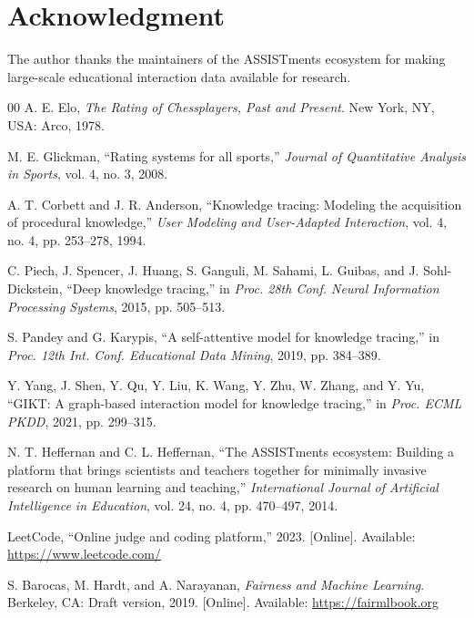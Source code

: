 \documentclass[conference]{IEEEtran}
\begin{document}
\section*{Acknowledgment}
The author thanks the maintainers of the ASSISTments ecosystem for making large-scale educational interaction data available for research.

\begin{thebibliography}{00}
A. E. Elo, \textit{The Rating of Chessplayers, Past and Present}. New York, NY, USA: Arco, 1978.

M. E. Glickman, ``Rating systems for all sports,'' \textit{Journal of Quantitative Analysis in Sports}, vol. 4, no. 3, 2008.

A. T. Corbett and J. R. Anderson, ``Knowledge tracing: Modeling the acquisition of procedural knowledge,'' \textit{User Modeling and User-Adapted Interaction}, vol. 4, no. 4, pp. 253--278, 1994.

C. Piech, J. Spencer, J. Huang, S. Ganguli, M. Sahami, L. Guibas, and J. Sohl-Dickstein, ``Deep knowledge tracing,'' in \textit{Proc. 28th Conf. Neural Information Processing Systems}, 2015, pp. 505--513.

S. Pandey and G. Karypis, ``A self-attentive model for knowledge tracing,'' in \textit{Proc. 12th Int. Conf. Educational Data Mining}, 2019, pp. 384--389.

Y. Yang, J. Shen, Y. Qu, Y. Liu, K. Wang, Y. Zhu, W. Zhang, and Y. Yu, ``GIKT: A graph-based interaction model for knowledge tracing,'' in \textit{Proc. ECML PKDD}, 2021, pp. 299--315.

N. T. Heffernan and C. L. Heffernan, ``The ASSISTments ecosystem: Building a platform that brings scientists and teachers together for minimally invasive research on human learning and teaching,'' \textit{International Journal of Artificial Intelligence in Education}, vol. 24, no. 4, pp. 470--497, 2014.

LeetCode, ``Online judge and coding platform,'' 2023. [Online]. Available: \url{https://www.leetcode.com/}

S. Barocas, M. Hardt, and A. Narayanan, \textit{Fairness and Machine Learning}. Berkeley, CA: Draft version, 2019. [Online]. Available: \url{https://fairmlbook.org}

\end{thebibliography}
\end{document}
